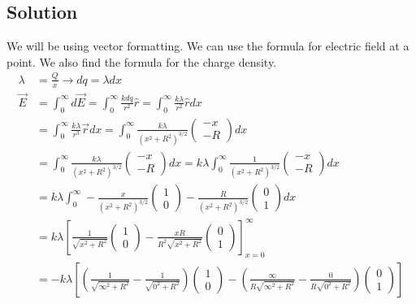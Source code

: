 \documentclass[12pt]{article}
\begin{document}
\subsection*{Solution}
We will be using vector formatting. We can use the formula for electric field at a point. We also find the formula for the charge density.
\begin{align*}
    \lambda &=  \frac{Q}{x} \rightarrow
    dq  =   \lambda dx\\
    \vec{E} &=  \int_{0}^{\infty} d\vec{E}
        =   \int_{0}^{\infty} \frac{k dq}{r^2} \hat{r}
        =   \int_{0}^{\infty} \frac{k \lambda}{r^2} \hat{r} dx\\
        &=   \int_{0}^{\infty} \frac{k \lambda}{r^3} \vec{r} dx
        =   \int_{0}^{\infty} \frac{k \lambda}{(x^2 + R^2)^{3/2}} \begin{pmatrix}-x\\-R\end{pmatrix} dx\\
        &=  \int_{0}^{\infty} \frac{k \lambda}{(x^2 + R^2)^{3/2}} \begin{pmatrix}-x\\-R\end{pmatrix} dx
        =   k \lambda \int_{0}^{\infty} \frac{1}{(x^2 + R^2)^{3/2}} \begin{pmatrix}-x\\-R\end{pmatrix} dx\\
        &=  k \lambda \int_{0}^{\infty} -\frac{x}{(x^2 + R^2)^{3/2}} \begin{pmatrix}1\\0\end{pmatrix} - \frac{R}{(x^2 + R^2)^{3/2}} \begin{pmatrix}0\\1\end{pmatrix} dx\\
        &=  k \lambda \left[\frac{1}{\sqrt{x^2 + R^2}} \begin{pmatrix}1\\0\end{pmatrix} - \frac{xR}{R^2\sqrt{x^2 + R^2}} \begin{pmatrix}0\\1\end{pmatrix}\right]_{x=0}^{\infty}\\
        &=  -k\lambda \left[\left(\frac{1}{\sqrt{\infty^2 + R^2}} - \frac{1}{\sqrt{0^2 + R^2}}\right) \begin{pmatrix}1\\0\end{pmatrix} - \left(\frac{\infty}{R\sqrt{\infty^2 + R^2}} - \frac{0}{R\sqrt{0^2 + R^2}}\right) \begin{pmatrix}0\\1\end{pmatrix}\right]\\

\end{align*}
\end{document}
